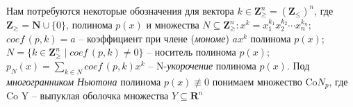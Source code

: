 Нам потребуются некоторые обозначения для вектора $k \in \mathbf{Z}^n_\geq = (\mathbf{Z}_\leq)^n$, где $\mathbf{Z}_\geq = \mathbf{N} \cup \{0\}$, полинома $p(x)$ и множества $N \subseteq \mathbf{Z}^n_\geq : x^k = x_1^{k_1}x_2^{k_2} \cdots x_n^{k_n}$; $\textit{coef}\,(p, k) = a$ -- коэффициент при члене (\emph{мономе}) $ax^k$ полинома $p(x)$; $N = \{k\in \mathbf{Z}^n_\geq \;| \;\textit{coef}\,(p, k) \neq 0\}$ -- носитель полинома $p(x)$; $p_N(x) = \sum\limits_{k \in N}\textit{coef}\,(p, k)x^k$ -- N-\emph{укорочение} полинома $p(x)$. Под \emph{многогранником Ньютона} полинома $p(x) \not\equiv 0$ понимаем множество $\text{Co} N_p$, где $\text{Co Y}$ -- выпуклая оболочка множества $Y \subseteq \mathbf{R}^n$












